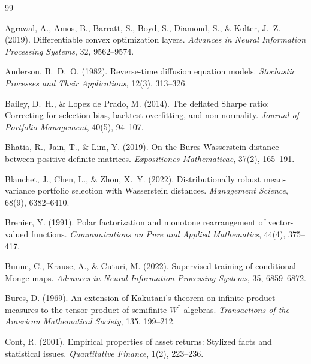 \documentclass{article}
\begin{document}
\begin{thebibliography}{99}

Agrawal, A., Amos, B., Barratt, S., Boyd, S., Diamond, S., \& Kolter, J.~Z.
(2019).
\newblock Differentiable convex optimization layers.
\newblock \emph{Advances in Neural Information Processing Systems}, 32,
  9562--9574.

Anderson, B.~D.~O. (1982).
\newblock Reverse-time diffusion equation models.
\newblock \emph{Stochastic Processes and Their Applications}, 12(3), 313--326.

Bailey, D.~H., \& Lopez de Prado, M. (2014).
\newblock The deflated Sharpe ratio: Correcting for selection bias, backtest
  overfitting, and non-normality.
\newblock \emph{Journal of Portfolio Management}, 40(5), 94--107.

Bhatia, R., Jain, T., \& Lim, Y. (2019).
\newblock On the Bures-Wasserstein distance between positive definite matrices.
\newblock \emph{Expositiones Mathematicae}, 37(2), 165--191.

Blanchet, J., Chen, L., \& Zhou, X.~Y. (2022).
\newblock Distributionally robust mean-variance portfolio selection with
  Wasserstein distances.
\newblock \emph{Management Science}, 68(9), 6382--6410.

Brenier, Y. (1991).
\newblock Polar factorization and monotone rearrangement of vector-valued
  functions.
\newblock \emph{Communications on Pure and Applied Mathematics}, 44(4),
  375--417.

Bunne, C., Krause, A., \& Cuturi, M. (2022).
\newblock Supervised training of conditional Monge maps.
\newblock \emph{Advances in Neural Information Processing Systems}, 35,
  6859--6872.

Bures, D. (1969).
\newblock An extension of Kakutani's theorem on infinite product measures to
  the tensor product of semifinite $W^*$-algebras.
\newblock \emph{Transactions of the American Mathematical Society}, 135,
  199--212.

Cont, R. (2001).
\newblock Empirical properties of asset returns: Stylized facts and statistical
  issues.
\newblock \emph{Quantitative Finance}, 1(2), 223--236.


\end{thebibliography}
\end{document}
